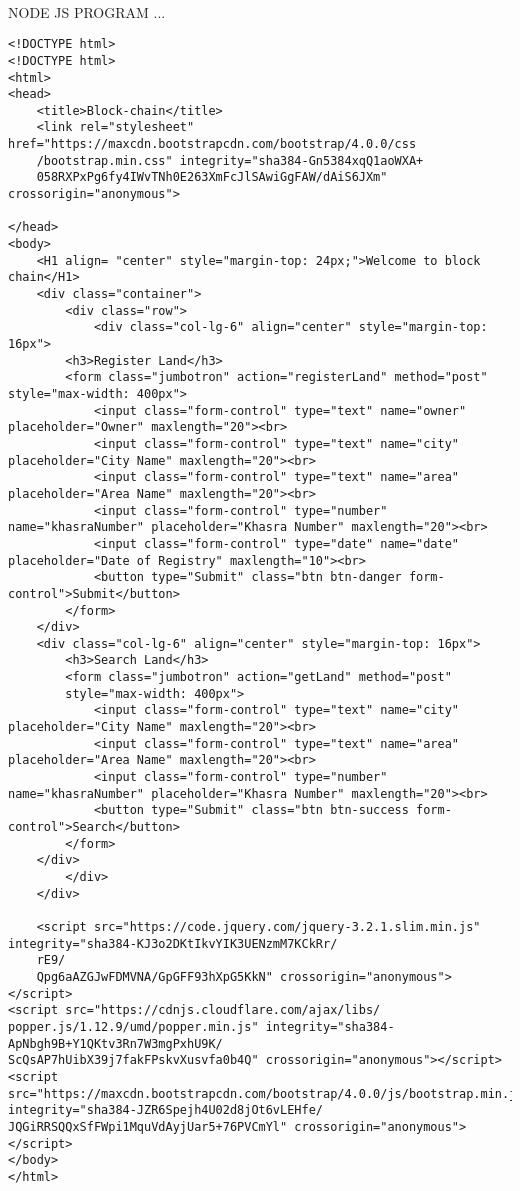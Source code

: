 \paragraph{} NODE JS PROGRAM ...
\begin{lstlisting}
<!DOCTYPE html>
<!DOCTYPE html>
<html>
<head>
	<title>Block-chain</title>
	<link rel="stylesheet" href="https://maxcdn.bootstrapcdn.com/bootstrap/4.0.0/css
	/bootstrap.min.css" integrity="sha384-Gn5384xqQ1aoWXA+
	058RXPxPg6fy4IWvTNh0E263XmFcJlSAwiGgFAW/dAiS6JXm" crossorigin="anonymous">

</head>
<body>
	<H1 align= "center" style="margin-top: 24px;">Welcome to block chain</H1>
	<div class="container">
		<div class="row">
			<div class="col-lg-6" align="center" style="margin-top: 16px">
		<h3>Register Land</h3>
		<form class="jumbotron" action="registerLand" method="post" style="max-width: 400px">
			<input class="form-control" type="text" name="owner" placeholder="Owner" maxlength="20"><br>
			<input class="form-control" type="text" name="city" placeholder="City Name" maxlength="20"><br>
			<input class="form-control" type="text" name="area" placeholder="Area Name" maxlength="20"><br>
			<input class="form-control" type="number" name="khasraNumber" placeholder="Khasra Number" maxlength="20"><br>
			<input class="form-control" type="date" name="date" placeholder="Date of Registry" maxlength="10"><br>
			<button type="Submit" class="btn btn-danger form-control">Submit</button>
		</form>
	</div>
	<div class="col-lg-6" align="center" style="margin-top: 16px">
		<h3>Search Land</h3>
		<form class="jumbotron" action="getLand" method="post"
		style="max-width: 400px">
			<input class="form-control" type="text" name="city" placeholder="City Name" maxlength="20"><br>
			<input class="form-control" type="text" name="area" placeholder="Area Name" maxlength="20"><br>
			<input class="form-control" type="number" name="khasraNumber" placeholder="Khasra Number" maxlength="20"><br>
			<button type="Submit" class="btn btn-success form-control">Search</button>
		</form>
	</div>
		</div>
	</div>
	
	<script src="https://code.jquery.com/jquery-3.2.1.slim.min.js" integrity="sha384-KJ3o2DKtIkvYIK3UENzmM7KCkRr/
	rE9/
	Qpg6aAZGJwFDMVNA/GpGFF93hXpG5KkN" crossorigin="anonymous"></script>
<script src="https://cdnjs.cloudflare.com/ajax/libs/
popper.js/1.12.9/umd/popper.min.js" integrity="sha384-ApNbgh9B+Y1QKtv3Rn7W3mgPxhU9K/
ScQsAP7hUibX39j7fakFPskvXusvfa0b4Q" crossorigin="anonymous"></script>
<script src="https://maxcdn.bootstrapcdn.com/bootstrap/4.0.0/js/bootstrap.min.js" integrity="sha384-JZR6Spejh4U02d8jOt6vLEHfe/
JQGiRRSQQxSfFWpi1MquVdAyjUar5+76PVCmYl" crossorigin="anonymous"></script>
</body>
</html>
\end{lstlisting}

